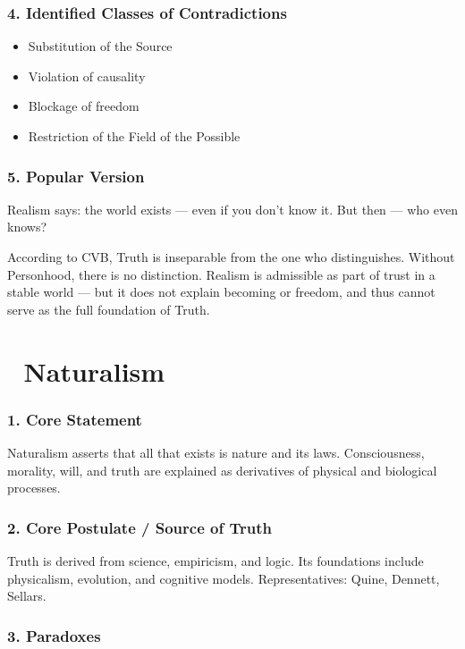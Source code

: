 \documentclass[12pt]{article}
\begin{document}
\subsubsection*{4. Identified Classes of Contradictions}

\begin{itemize}
\item Substitution of the Source
\item Violation of causality
\item Blockage of freedom
\item Restriction of the Field of the Possible
\end{itemize}

\subsubsection*{5. Popular Version}

Realism says: the world exists — even if you don’t know it. But then — who even knows?

According to CVB, Truth is inseparable from the one who distinguishes. Without Personhood, there is no distinction. Realism is admissible as part of trust in a stable world — but it does not explain becoming or freedom, and thus cannot serve as the full foundation of Truth.

\section*{🔷 Naturalism}

\subsubsection*{1. Core Statement}

Naturalism asserts that all that exists is nature and its laws. Consciousness, morality, will, and truth are explained as derivatives of physical and biological processes.

\subsubsection*{2. Core Postulate / Source of Truth}

Truth is derived from science, empiricism, and logic. Its foundations include physicalism, evolution, and cognitive models. Representatives: Quine, Dennett, Sellars.

\subsubsection*{3. Paradoxes}
\end{document}
